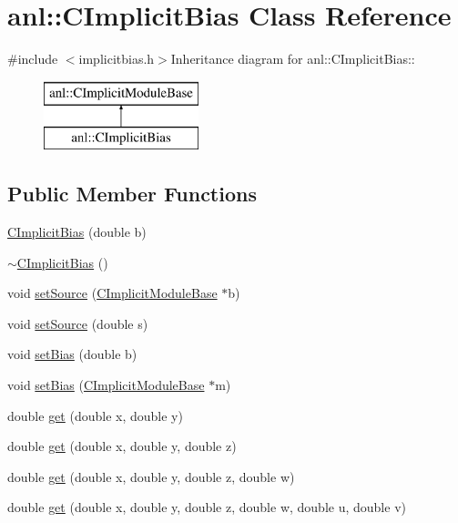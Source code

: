 \hypertarget{classanl_1_1CImplicitBias}{
\section{anl::CImplicitBias Class Reference}
\label{classanl_1_1CImplicitBias}
}


{\ttfamily \#include $<$implicitbias.h$>$}Inheritance diagram for anl::CImplicitBias::\begin{figure}[H]
\begin{center}
\leavevmode
\includegraphics[height=2cm]{classanl_1_1CImplicitBias}
\end{center}
\end{figure}
\subsection*{Public Member Functions}
\begin{DoxyCompactItemize}
\item 
\hyperlink{classanl_1_1CImplicitBias_a2af979ed5ee2312b332b7372e854d4be}{CImplicitBias} (double b)
\item 
\hyperlink{classanl_1_1CImplicitBias_a8770e753c881794a6a59fa674c2fcfe9}{$\sim$CImplicitBias} ()
\item 
void \hyperlink{classanl_1_1CImplicitBias_aef5b1aaa27cf36d9746b76b5ce9b631d}{setSource} (\hyperlink{classanl_1_1CImplicitModuleBase}{CImplicitModuleBase} $\ast$b)
\item 
void \hyperlink{classanl_1_1CImplicitBias_a73a88a5c2526b8d52b1445cddf804dd8}{setSource} (double s)
\item 
void \hyperlink{classanl_1_1CImplicitBias_a17cca1b9edba91f27cd91e05861cb2c7}{setBias} (double b)
\item 
void \hyperlink{classanl_1_1CImplicitBias_a0f7add9e5a0a82868795a7f1b7e6bcae}{setBias} (\hyperlink{classanl_1_1CImplicitModuleBase}{CImplicitModuleBase} $\ast$m)
\item 
double \hyperlink{classanl_1_1CImplicitBias_a7bc226cf7d835946936e76144e56a5b6}{get} (double x, double y)
\item 
double \hyperlink{classanl_1_1CImplicitBias_a31ad13c0e8b41f5d8b8df9d93f22501d}{get} (double x, double y, double z)
\item 
double \hyperlink{classanl_1_1CImplicitBias_a9b033816e96601675dd0d9abdd56df4e}{get} (double x, double y, double z, double w)
\item 
double \hyperlink{classanl_1_1CImplicitBias_a8ca95f9d44c9c86a4d79a08906d6b029}{get} (double x, double y, double z, double w, double u, double v)
\end{DoxyCompactItemize}
